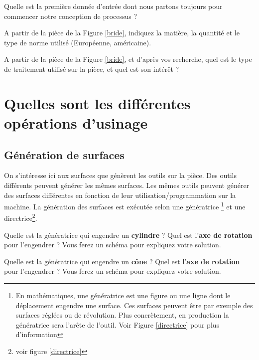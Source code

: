 \documentclass[12pt]{article}
\newcounter{exo}
\newenvironment{exo}{\stepcounter{exo}\vspace{0.5cm}{\bfseries Question \theexo\ :}}{\par\vspace{0.5cm}}
\begin{document}
\begin{exo} Quelle est la première donnée d'entrée dont nous partons toujours pour commencer notre conception de processus ?\end{exo}

\begin{exo} A partir de la pièce de la Figure \ref{bride}, indiquez la matière, la quantité et le type de norme utilisé (Européenne, américaine).\end{exo}





\begin{exo} A partir de la pièce de la Figure \ref{bride}, et d'après vos recherche, quel est le type de traitement utilisé sur la pièce, et quel est son intérêt ? \end{exo}



\section{Quelles sont les différentes opérations d'usinage}
\subsection{Génération de surfaces}
On s'intéresse ici aux surfaces que génèrent les outils sur la pièce. Des outils différents peuvent générer les mêmes surfaces. Les mêmes outils peuvent générer des surfaces différentes en fonction de leur utilisation/programmation sur la machine. La génération des surfaces est exécutée selon une génératrice \footnote{En mathématiques, une génératrice est une figure ou une ligne dont le déplacement engendre une surface. Ces surfaces peuvent être par exemple des surfaces réglées ou de révolution. Plus concrètement, en production la génératrice sera l'arête de l’outil. Voir Figure \ref{directrice} pour plus d'information} et une directrice\footnote{voir figure \ref{directrice} }.

\begin{exo} Quelle est la génératrice qui engendre un \textbf{cylindre} ? Quel est l'\textbf{axe de rotation} pour l'engendrer ? Vous ferez un schéma pour expliquez votre solution.\end{exo}

\begin{exo} Quelle est la génératrice qui engendre un \textbf{cône} ? Quel est l'\textbf{axe de rotation} pour l'engendrer ? Vous ferez un schéma pour expliquez votre solution.\end{exo}
\end{document}
